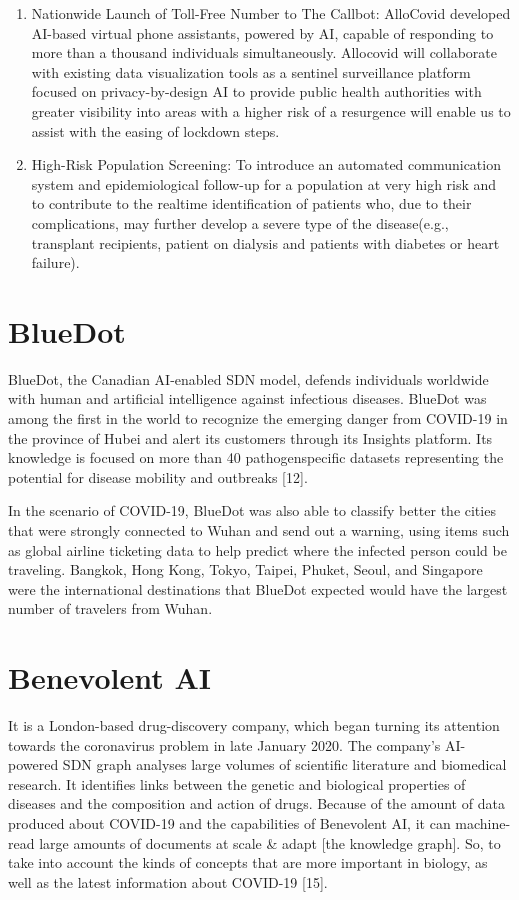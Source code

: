 \documentclass[10pt]{article}
\begin{document}
\begin{enumerate}
  \item Nationwide Launch of Toll-Free Number to The Callbot: AlloCovid developed AI-based virtual phone assistants, powered by AI, capable of responding to more than a thousand individuals simultaneously. Allocovid will collaborate with existing data visualization tools as a sentinel surveillance platform focused on privacy-by-design AI to provide public health authorities with greater visibility into areas with a higher risk of a resurgence will enable us to assist with the easing of lockdown steps.

  \item High-Risk Population Screening: To introduce an automated communication system and epidemiological follow-up for a population at very high risk and to contribute to the realtime identification of patients who, due to their complications, may further develop a severe type of the disease(e.g., transplant recipients, patient on dialysis and patients with diabetes or heart failure).

\end{enumerate}

\section{BlueDot}
BlueDot, the Canadian AI-enabled SDN model, defends individuals worldwide with human and artificial intelligence against infectious diseases. BlueDot was among the first in the world to recognize the emerging danger from COVID-19 in the province of Hubei and alert its customers through its Insights platform. Its knowledge is focused on more than 40 pathogenspecific datasets representing the potential for disease mobility and outbreaks [12].

In the scenario of COVID-19, BlueDot was also able to classify better the cities that were strongly connected to Wuhan and send out a warning, using items such as global airline ticketing data to help predict where the infected person could be traveling. Bangkok, Hong Kong, Tokyo, Taipei, Phuket, Seoul, and Singapore were the international destinations that BlueDot expected would have the largest number of travelers from Wuhan.

\section{Benevolent AI}
It is a London-based drug-discovery company, which began turning its attention towards the coronavirus problem in late January 2020. The company's AI-powered SDN graph analyses large volumes of scientific literature and biomedical research. It identifies links between the genetic and biological properties of diseases and the composition and action of drugs. Because of the amount of data produced about COVID-19 and the capabilities of Benevolent AI, it can machine-read large amounts of documents at scale \& adapt [the knowledge graph]. So, to take into account the kinds of concepts that are more important in biology, as well as the latest information about COVID-19 [15].
\end{document}
